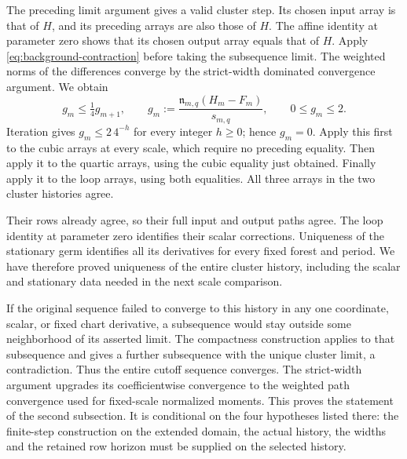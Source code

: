 The preceding limit argument gives a valid cluster step. Its
chosen input array is that of $H$, and its preceding arrays are
also those of $H$. The affine identity at parameter zero shows
that its chosen output array equals that of $H$. Apply
\eqref{eq:background-contraction} before taking the subsequence
limit. The weighted norms of the differences converge by the
strict-width dominated convergence argument. We obtain
\[
 g_m\le\tfrac14 g_{m+1},\qquad
 g_m:=\frac{\mathfrak n_{m,q}(H_m-F_m)}{s_{m,q}},
                  \qquad 0\le g_m\le2.
\]
Iteration gives $g_m\le2\,4^{-h}$ for every integer $h\ge0$;
hence $g_m=0$. Apply this first to the cubic arrays at every
scale, which require no preceding equality. Then apply it to
the quartic arrays, using the cubic equality just obtained.
Finally apply it to the loop arrays, using both equalities.
All three arrays in the two cluster histories agree.

Their rows already agree, so their full input and output paths
agree. The loop identity at parameter zero identifies their
scalar corrections. Uniqueness of the stationary germ identifies
all its derivatives for every fixed forest and period. We have
therefore proved uniqueness of the entire cluster history,
including the scalar and stationary data needed in the next
scale comparison.

If the original sequence failed to converge to this history in
any one coordinate, scalar, or fixed chart derivative, a
subsequence would stay outside some neighborhood of its asserted
limit. The compactness construction applies to that subsequence
and gives a further subsequence with the unique cluster limit,
a contradiction. Thus the entire cutoff sequence converges.
The strict-width argument upgrades its coefficientwise convergence
to the weighted path convergence used for fixed-scale normalized
moments. This proves the statement of the second subsection. It is
conditional on the four hypotheses listed there: the finite-step
construction on the extended domain, the actual history, the widths
and the retained row horizon must be supplied on the selected
history.
